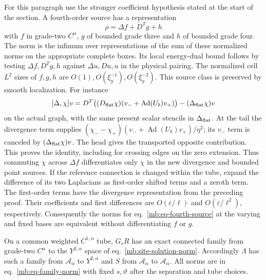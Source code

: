 \documentclass[11pt,letterpaper,reqno]{amsart}
\makeatletter
\numberwithin{equation}{section}
\renewcommand{\eqref}[1]{\textup{eq.~\ref{#1}}}
\theoremstyle{definition}
\newcommand{\ms@minorstart}{%
  \pushQED{\qed}\renewcommand{\qedsymbol}{$\blacksquare$}}
\newenvironment{lemma}[1][]{\ms@minorstart\ms@lemma[#1]}
  {\popQED\endms@lemma}
\theoremstyle{remark}
\makeatother
\begin{document}
For this paragraph use the stronger coefficient hypothesis stated at the start of the section. A fourth-order source has a representation
\begin{equation}\label{mb:eq-fourth-source}
                 \rho=\Delta f+D^Tg+h
\end{equation}
with \(f\) in grade-two \(C^\alpha\), \(g\) of bounded grade three and \(h\) of bounded grade four. The norm is the infimum over representations of the sum of these normalized norms on the appropriate complete boxes. Its local energy-dual bound follows by testing \(\Delta f,D^Tg,h\) against \(\Delta u,Du,u\) in the physical pairing. The normalized cell \(L^2\) sizes of \(f,g,h\) are \(O(1),O(\xi_y^{-1}),O(\xi_y^{-2})\). This source class is preserved by smooth localization. For instance
\[
 [\Delta,\chi]v=D^T\big((D_{\rm flat}\chi)(v_-+\operatorname{Ad}(U_b)v_+)\big)
                               -(\Delta_{\rm flat}\chi)v
\]
on the actual graph, with the same present scalar stencils in \(\Delta_{\rm flat}\). At the tail the divergence term supplies \((\chi_--\chi_+)(v_-+\operatorname{Ad}(U_b)v_+)/\eta^2\); its \(v_-\) term is canceled by \((\Delta_{\rm flat}\chi)v\). The head gives the transported opposite contribution. This proves the identity, including for crossing edges on the zero extension. Thus commuting \(\chi\) across \(\Delta f\) differentiates only \(\chi\) in the new divergence and bounded point sources. If the reference connection is changed within the tube, expand the difference of its two Laplacians as first-order shifted terms and a zeroth term. The first-order terms have the divergence representation from the preceding proof. Their coefficients and first differences are \(O(\varepsilon/\ell)\) and \(O(\varepsilon/\ell^2)\), respectively. Consequently the norms for \eqref{mb:eq-fourth-source} at the varying and fixed bases are equivalent without differentiating \(f\) or \(g\).

\begin{lemma}[Strong restoration family]
\label{mb:lem-strong-restoration-family}
On a common weighted \(C^{1,\alpha}\) tube, \(G_sR\) has an exact connected family from grade-two \(C^\alpha\) to the \(Y^{2,\alpha}\) space of \eqref{mb:site-solution-norm}. Accordingly \(\Lambda\) has such a family from \(\mathcal A_\alpha\) to \(Y^{2,\alpha}\) and \(S\) from \(\mathcal A_\alpha\) to \(\mathcal A_\alpha\). All norms are in \eqref{mb:eq-family-norm} with fixed \(s,\vartheta\) after the separation and tube choices.
\end{lemma}
\end{document}
